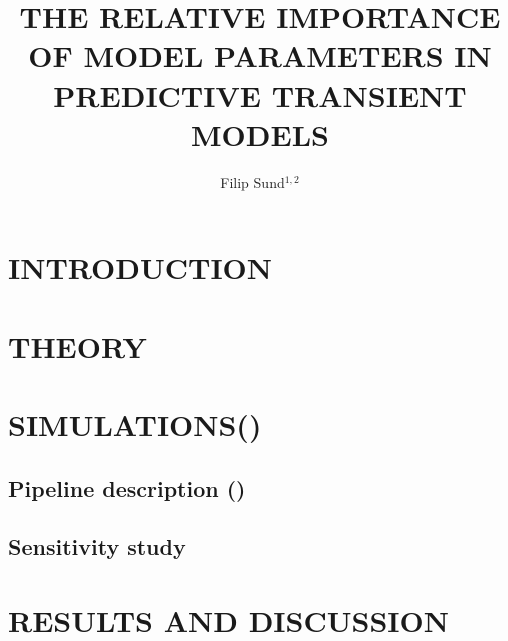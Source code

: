 \documentclass{mekit17}
\title{THE RELATIVE IMPORTANCE OF MODEL PARAMETERS IN PREDICTIVE TRANSIENT MODELS}
\author{Filip Sund$^{1,2}$}
\begin{document}

\printlength{\textheight}
\printlength{\textwidth}

\printlength{\textheight}
\printlength{\textwidth}

\section{INTRODUCTION}


\section{THEORY}
\label{theory}


\section{SIMULATIONS()}
\label{simulations}
\subsection{Pipeline description ()}
\label{subsec:pipeline}

\subsection{Sensitivity study}


\section{RESULTS AND DISCUSSION}
\label{results}

\end{document}

